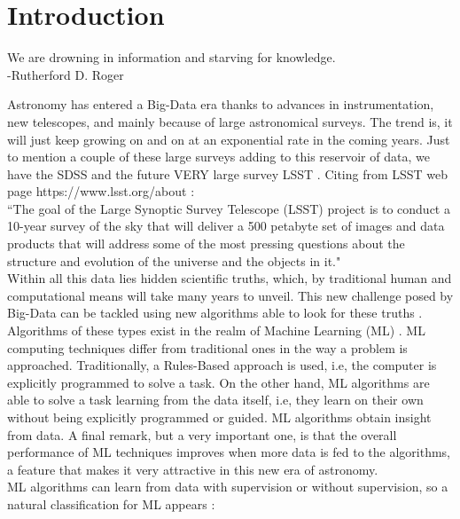 \section{Introduction}

\begin{flushright}
We are drowning in information and starving for knowledge.\\
-Rutherford D. Roger
\end{flushright}

Astronomy has entered a Big-Data era \cite{Moravec2019} \cite{Siemiginowska2019} \cite{Feigelson2012} thanks to advances in instrumentation, new telescopes, and mainly because of large astronomical surveys. The trend is, it will just keep growing on and on at an exponential rate in the coming years. Just to mention a couple of these large surveys adding to this reservoir of data, we have the SDSS \cite{Gunn2006a} \cite{Werijmans2015} and the future VERY large survey  LSST \cite{Ivezic2008}. Citing from LSST web page https://www.lsst.org/about : \\

``The goal of the Large Synoptic Survey Telescope (LSST) project is to conduct a 10-year survey of the sky that will deliver a 500 petabyte set of images and data products that will address some of the most pressing questions about the structure and evolution of the universe and the objects in it."\\

Within all this data lies hidden scientific truths, which, by traditional human and computational means will take many years to unveil. This new challenge posed by Big-Data can be tackled using new algorithms able to look for these truths \cite{Baron2017} \cite{Tshitoyan2019}. Algorithms of these types exist in the realm of Machine Learning (ML) \cite{Geron2017}. ML computing techniques differ from traditional ones in the way a problem is approached. Traditionally, a Rules-Based approach \cite{Patel2019} is used, i.e, the computer is explicitly programmed to solve a task. On the other hand, ML algorithms are able to solve a task learning from the data itself, i.e, they learn on their own without being explicitly programmed or guided. ML algorithms obtain insight from data. A final remark, but a very important one, is that the overall performance of ML techniques improves when more data is fed to the algorithms, a feature that makes it very attractive in this new era of astronomy.\\

ML algorithms can learn from data with supervision or without supervision, so a natural classification for ML appears \cite{Geron2017} \cite{Patel2019}: 

